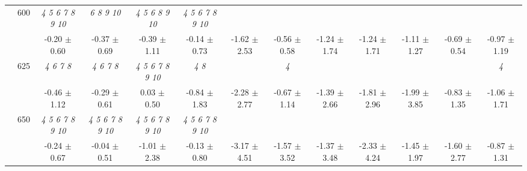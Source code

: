 \begin{table}[h]
{\begin{tabular}{
        ccccccccccccc}
 & \multirow{2}{*}{600}& \textit{  4  5  6  7  8  9 10 }& \textit{  6  8  9 10 }& \textit{  4  5  6  8  9 10 }& \textit{  4  5  6  7  8  9 10 }& & & & & & &  \\ 
 & & -0.20 $\pm$ 0.60& -0.37 $\pm$ 0.69& -0.39 $\pm$ 1.11& -0.14 $\pm$ 0.73& -1.62 $\pm$ 2.53& -0.56 $\pm$ 0.58& -1.24 $\pm$ 1.74& -1.24 $\pm$ 1.71& -1.11 $\pm$ 1.27& -0.69 $\pm$ 0.54& -0.97 $\pm$ 1.19 \\ 
 & \multirow{2}{*}{625}& \cellcolor[HTML]{EFEFEF} \textit{ 4 6 7 8 }& \cellcolor[HTML]{EFEFEF} \textit{ 4 6 7 8 }& \cellcolor[HTML]{EFEFEF} \textit{  4  5  6  7  8  9 10 }& \cellcolor[HTML]{EFEFEF} \textit{ 4 8 }& \cellcolor[HTML]{EFEFEF} & \cellcolor[HTML]{EFEFEF} \textit{ 4 }& \cellcolor[HTML]{EFEFEF} & \cellcolor[HTML]{EFEFEF} & \cellcolor[HTML]{EFEFEF} & \cellcolor[HTML]{EFEFEF} & \cellcolor[HTML]{EFEFEF} \textit{ 4 } \\ 
 & & \cellcolor[HTML]{EFEFEF} -0.46 $\pm$ 1.12& \cellcolor[HTML]{EFEFEF} -0.29 $\pm$ 0.61& \cellcolor[HTML]{EFEFEF} 0.03 $\pm$ 0.50& \cellcolor[HTML]{EFEFEF} -0.84 $\pm$ 1.83& \cellcolor[HTML]{EFEFEF} -2.28 $\pm$ 2.77& \cellcolor[HTML]{EFEFEF} -0.67 $\pm$ 1.14& \cellcolor[HTML]{EFEFEF} -1.39 $\pm$ 2.66& \cellcolor[HTML]{EFEFEF} -1.81 $\pm$ 2.96& \cellcolor[HTML]{EFEFEF} -1.99 $\pm$ 3.85& \cellcolor[HTML]{EFEFEF} -0.83 $\pm$ 1.35& \cellcolor[HTML]{EFEFEF} -1.06 $\pm$ 1.71 \\ 
 & \multirow{2}{*}{650}& \textit{  4  5  6  7  8  9 10 }& \textit{  4  5  6  7  8  9 10 }& \textit{  4  5  6  7  8  9 10 }& \textit{  4  5  6  7  8  9 10 }& & & & & & &  \\ 
 & & -0.24 $\pm$ 0.67& -0.04 $\pm$ 0.51& -1.01 $\pm$ 2.38& -0.13 $\pm$ 0.80& -3.17 $\pm$ 4.51& -1.57 $\pm$ 3.52& -1.37 $\pm$ 3.48& -2.33 $\pm$ 4.24& -1.45 $\pm$ 1.97& -1.60 $\pm$ 2.77& -0.87 $\pm$ 1.31 \\ \midrule 

        \bottomrule
        \end{tabular}%
        }

        \end{table}
        
